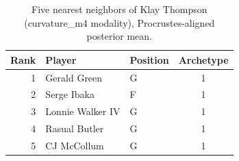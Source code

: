 \begin{table}[htbp]
  \centering\small
  \begin{tabular}{rllc}
    \toprule
    Rank & Player & Position & Archetype \\
    \midrule
    1 & Gerald Green & G & 1 \\
    2 & Serge Ibaka & F & 1 \\
    3 & Lonnie Walker IV & G & 1 \\
    4 & Rasual Butler & G & 1 \\
    5 & CJ McCollum & G & 1 \\
    \bottomrule
  \end{tabular}
  \caption{Five nearest neighbors of Klay Thompson (curvature_m4 modality), Procrustes-aligned posterior mean.}
  \label{tab:Klay_Thompson_neighbors_curvature_m4}
\end{table}

